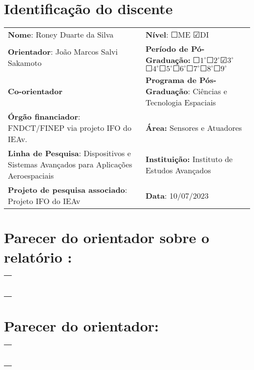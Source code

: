 
\section{Identificação do discente}
\begin{center}
\begin{tabular}{>{\raggedright}p{}>{\raggedright}p{}}
\toprule 
\textbf{Nome}: Roney Duarte da Silva & \textbf{Nível}: $\Square$ME $\CheckedBox$DI\tabularnewline
\textbf{Orientador}: João Marcos Salvi Sakamoto & \textbf{Período de Pó-Graduação:} $\Square1^{\circ}$$\Square2^{\circ}$$\CheckedBox3^{\circ}$$\Square4^{\circ}$$\Square5^{\circ}$$\Square6^{\circ}$$\Square7^{\circ}$$\Square8^{\circ}$$\Square9^{\circ}$\tabularnewline
\textbf{Co-orientador} & \textbf{Programa de Pós-Graduação}: Ciências e Tecnologia Espaciais\tabularnewline
\textbf{Órgão financiador}: FNDCT/FINEP via projeto IFO do IEAv. & \textbf{Área:} Sensores e Atuadores\tabularnewline
\textbf{Linha de Pesquisa}: Dispositivos e Sistemas Avançados para
Aplicações Aeroespaciais & \textbf{Instituição:} Instituto de Estudos Avançados \tabularnewline
\textbf{Projeto de pesquisa associado}: Projeto IFO do IEAv & \textbf{Data}: 10/07/2023\tabularnewline
\bottomrule
\end{tabular}
\par\end{center}

\section{Parecer do orientador sobre o relatório :}
\begin{center}
\begin{tabular}{|>{\raggedright}m{}|}
\hline 
\tabularnewline
\tabularnewline
\tabularnewline
\tabularnewline
\tabularnewline
\tabularnewline
\tabularnewline
\hline 
\end{tabular}
\par\end{center}

\section{Parecer do orientador:}
\begin{center}
\begin{tabular}{|>{\raggedright}m{}|}
\hline 
\tabularnewline
\tabularnewline
\tabularnewline
\tabularnewline
\tabularnewline
\tabularnewline
\tabularnewline
\hline 
\end{tabular}
\par\end{center}
